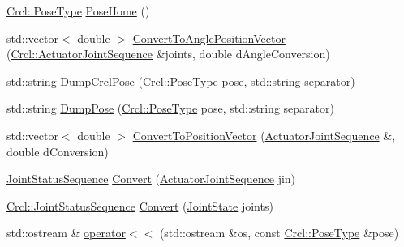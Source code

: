 \begin{DoxyCompactItemize}
\item 
\hyperlink{namespaceCrcl_acc6c82b52280f4d0e74b82a92400956e}{Crcl\-::\-Pose\-Type} \hyperlink{namespaceCrcl_a5e9036e140bcf2156b7995085f36d75f}{Pose\-Home} ()
\item 
std\-::vector$<$ double $>$ \hyperlink{namespaceCrcl_a942871711b02866236621b132bf934c2}{Convert\-To\-Angle\-Position\-Vector} (\hyperlink{namespaceCrcl_af084766e8e2d38a135cc67ef54d9904d}{Crcl\-::\-Actuator\-Joint\-Sequence} \&joints, double d\-Angle\-Conversion)
\item 
std\-::string \hyperlink{namespaceCrcl_a1a29224fab4f85cc9e34b1f7a1a1064f}{Dump\-Crcl\-Pose} (\hyperlink{namespaceCrcl_acc6c82b52280f4d0e74b82a92400956e}{Crcl\-::\-Pose\-Type} pose, std\-::string separator)
\item 
std\-::string \hyperlink{namespaceCrcl_a666314177998417d741895bb491783bd}{Dump\-Pose} (\hyperlink{namespaceCrcl_acc6c82b52280f4d0e74b82a92400956e}{Crcl\-::\-Pose\-Type} pose, std\-::string separator)
\item 
std\-::vector$<$ double $>$ \hyperlink{namespaceCrcl_af6bec848a13c03669ca8920795c5d3ad}{Convert\-To\-Position\-Vector} (\hyperlink{namespaceCrcl_af084766e8e2d38a135cc67ef54d9904d}{Actuator\-Joint\-Sequence} \&, double d\-Conversion)
\item 
\hyperlink{namespaceCrcl_a8e2d423195eeffb85b45b63f595f2825}{Joint\-Status\-Sequence} \hyperlink{namespaceCrcl_a329b70844c080b1a81c89989b58ffbd5}{Convert} (\hyperlink{namespaceCrcl_af084766e8e2d38a135cc67ef54d9904d}{Actuator\-Joint\-Sequence} jin)
\item 
\hyperlink{namespaceCrcl_a8e2d423195eeffb85b45b63f595f2825}{Crcl\-::\-Joint\-Status\-Sequence} \hyperlink{namespaceCrcl_a1f43fba61abba477ee664c4b5c6dd65b}{Convert} (\hyperlink{RCS_8h_aa4adb93a26caa4dacba9c9614e283245}{Joint\-State} joints)
\item 
std\-::ostream \& \hyperlink{namespaceCrcl_a043eb5308a43b100a739ac45bde3501d}{operator$<$$<$} (std\-::ostream \&os, const \hyperlink{namespaceCrcl_acc6c82b52280f4d0e74b82a92400956e}{Crcl\-::\-Pose\-Type} \&pose)
\end{DoxyCompactItemize}

